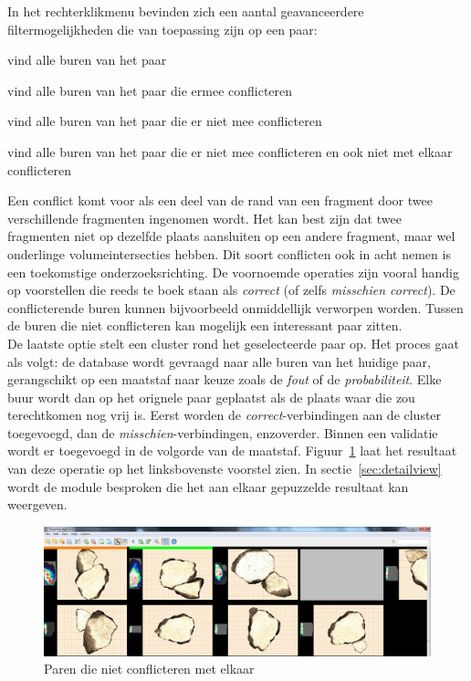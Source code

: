 In het rechterklikmenu bevinden zich een aantal geavanceerdere filtermogelijkheden die van toepassing zijn op een paar: 

\begin{packed_itemize}
  \item vind alle buren van het paar
  \item vind alle buren van het paar die ermee conflicteren
  \item vind alle buren van het paar die er niet mee conflicteren
  \item vind alle buren van het paar die er niet mee conflicteren en ook niet met elkaar conflicteren
\end{packed_itemize}

Een conflict komt voor als een deel van de rand van een fragment door twee verschillende fragmenten ingenomen wordt. Het kan best zijn dat twee fragmenten niet op dezelfde plaats aansluiten op een andere fragment, maar wel onderlinge volumeintersecties hebben. Dit soort conflicten ook in acht nemen is een toekomstige onderzoeksrichting. De voornoemde operaties zijn vooral handig op voorstellen die reeds te boek staan als \emph{correct} (of zelfs \emph{misschien correct}). De conflicterende buren kunnen bijvoorbeeld onmiddellijk verworpen worden. Tussen de buren die niet conflicteren kan mogelijk een interessant paar zitten. \\

De laatste optie stelt een cluster rond het geselecteerde paar op. Het proces gaat als volgt: de database wordt gevraagd naar alle buren van het huidige paar, gerangschikt op een maatstaf naar keuze zoals de \emph{fout} of de \emph{probabiliteit}. Elke buur wordt dan op het orignele paar geplaatst als de plaats waar die zou terechtkomen nog vrij is. Eerst worden de \emph{correct}-verbindingen aan de cluster toegevoegd, dan de \emph{misschien}-verbindingen, enzoverder. Binnen een validatie wordt er toegevoegd in de volgorde van de maatstaf. Figuur~\ref{fig:tileview-progconflict} laat het resultaat van deze operatie op het linksbovenste voorstel zien. In sectie~\ref{sec:detailview} wordt de module besproken die het aan elkaar gepuzzelde resultaat kan weergeven. \\

\begin{figure}[ht]
	\begin{center}
		\includegraphics[width=1.0\columnwidth]{images/matchtileview-progconflict-01-reduced.png}
		\caption{Paren die niet conflicteren met elkaar}
		\label{fig:tileview-progconflict}
	\end{center}
\end{figure}

